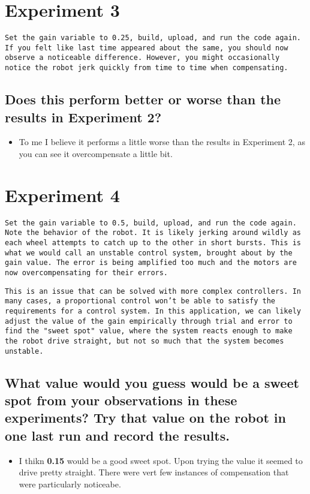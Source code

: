 \documentclass[11pt]{article}
\begin{document}
\section{Experiment 3}
\label{sec:org18948f1}
\texttt{Set the gain variable to 0.25, build, upload, and run the code again. If you felt like last time appeared about the same, you should now observe a noticeable difference. However, you might occasionally notice the robot jerk quickly from time to time when compensating.}
\subsection{Does this perform better or worse than the results  in Experiment 2?}
\label{sec:org11954e5}
\begin{itemize}
\item To me I believe it performs a little worse than the results in Experiment 2, as you can see it overcompensate a little bit.
\end{itemize}
\section{Experiment 4}
\label{sec:orgeb58fec}
\texttt{Set the gain variable to 0.5, build, upload, and run the code again. Note the behavior of the robot. It is likely jerking around wildly as each wheel attempts to catch up to the other in short bursts. This is what we would call an unstable control system, brought about by the gain value. The error is being amplified too much and the motors are now overcompensating for their errors.}

\texttt{This is an issue that can be solved with more complex controllers. In many cases, a proportional control won't be able to satisfy the requirements for a control system. In this application, we can likely adjust the value of the gain empirically through trial and error to find the "sweet spot" value, where the system reacts enough to make the robot drive straight, but not so much that the system becomes unstable.}
\subsection{What value would you guess would be a sweet spot from your observations in these experiments? Try that value on the robot in one last run and record the results.}
\label{sec:org630ae17}
\begin{itemize}
\item I thikn \textbf{0.15} would be a good sweet spot. Upon trying the value it seemed to drive pretty straight. There were vert few instances of compensation that were particularly noticeabe.
\end{itemize}
\end{document}

